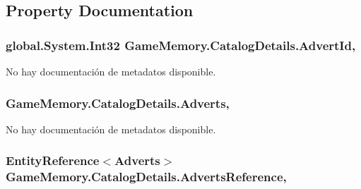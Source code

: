 \subsection{Property Documentation}
\hypertarget{class_game_memory_1_1_catalog_details_a32f193effd2e8f0b2704a630aac83568}{
\subsubsection[{Advert\-Id}]{\setlength{\rightskip}{0pt plus 5cm}global.\-System.\-Int32 Game\-Memory.\-Catalog\-Details.\-Advert\-Id\hspace{0.3cm}{\ttfamily [get]}, {\ttfamily [set]}}}\label{class_game_memory_1_1_catalog_details_a32f193effd2e8f0b2704a630aac83568}


No hay documentación de metadatos disponible. 

\hypertarget{class_game_memory_1_1_catalog_details_a306dacf87ecd5eb2d745931a4a1e61a0}{
\subsubsection[{Adverts}]{ Game\-Memory.\-Catalog\-Details.\-Adverts\hspace{0.3cm}{\ttfamily [get]}, {\ttfamily [set]}}}\label{class_game_memory_1_1_catalog_details_a306dacf87ecd5eb2d745931a4a1e61a0}


No hay documentación de metadatos disponible. 

\hypertarget{class_game_memory_1_1_catalog_details_a5ec9ce97ac5bb4461b10da5ace45e81b}{
\subsubsection[{Adverts\-Reference}]{\setlength{\rightskip}{0pt plus 5cm}Entity\-Reference$<${\bf Adverts}$>$ Game\-Memory.\-Catalog\-Details.\-Adverts\-Reference\hspace{0.3cm}{\ttfamily [get]}, {\ttfamily [set]}}}\label{class_game_memory_1_1_catalog_details_a5ec9ce97ac5bb4461b10da5ace45e81b}



